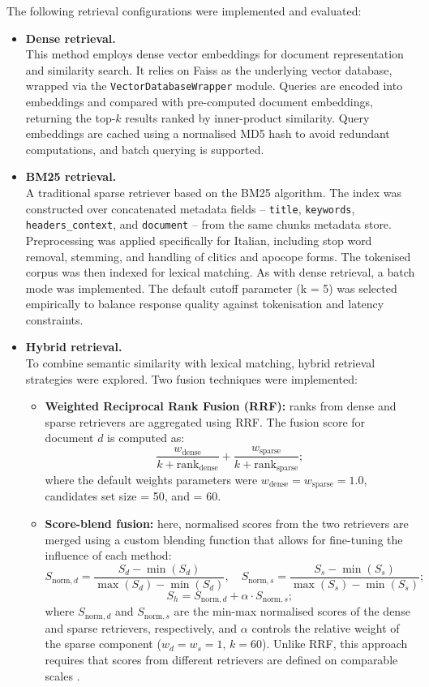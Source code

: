 \begin{spacing}{1.5}
\noindent The following retrieval configurations were implemented and evaluated:
\begin{itemize}
    \item \textbf{Dense retrieval.}\\
    This method employs dense vector embeddings for document representation and similarity search. It relies on Faiss as the underlying vector database, wrapped via the \texttt{VectorDatabaseWrapper} module. Queries are encoded into embeddings and compared with pre-computed document embeddings, returning the top-$k$ results ranked by inner-product similarity. Query embeddings are cached using a normalised MD5 hash to avoid redundant computations, and batch querying is supported.
    \item \textbf{BM25 retrieval.}\\ 
    A traditional sparse retriever based on the BM25 algorithm. The index was constructed over concatenated metadata fields -- \texttt{title}, \texttt{keywords}, \texttt{headers\_context}, and \texttt{document} -- from the same chunks metadata store. Preprocessing was applied specifically for Italian, including stop word removal, stemming, and handling of clitics and apocope forms. The tokenised corpus was then indexed for lexical matching. As with dense retrieval, a batch mode was implemented. The default cutoff parameter (k = 5) was selected empirically to balance response quality against tokenisation and latency constraints.
    \item \textbf{Hybrid retrieval.}\\ 
    To combine semantic similarity with lexical matching, hybrid retrieval strategies were explored. Two fusion techniques were implemented:
    \begin{itemize}
            \item \textbf{Weighted Reciprocal Rank Fusion (RRF):} ranks from dense and sparse retrievers are aggregated using RRF. The fusion score for document $d$ is computed as:
\[
\frac{w_\mathrm{dense}}{k + \mathrm{rank}_\mathrm{dense}} + \frac{w_\mathrm{sparse}}{k + \mathrm{rank}_\mathrm{sparse}} ;
\]
where the default weights parameters were $w_{\text{dense}} = w_{\text{sparse}} = 1.0$, candidates set size = 50, and  = 60.
            \item \textbf{Score-blend fusion:} here, normalised scores from the two retrievers are merged using a custom blending function that allows for fine-tuning the influence of each method:
\[
S_{\text{norm},d} = \frac{S_d - \min(S_d)}{\max(S_d) - \min(S_d)}, \quad  
S_{\text{norm},s} = \frac{S_s - \min(S_s)}{\max(S_s) - \min(S_s)} 
;\]
\[
S_h = S_{\text{norm},d} + \alpha \cdot S_{\text{norm},s} ;
\]
where $S_{\text{norm},d}$ and $S_{\text{norm},s}$ are the min-max normalised scores of the dense and sparse retrievers, respectively, and $\alpha$ controls the relative weight of the sparse component ($w_d = w_s = 1$, $k = 60$). Unlike RRF, this approach requires that scores from different retrievers are defined on comparable scales \parencite{wang_searching_2024}.
\end{itemize}
\end{itemize}




\end{spacing}
